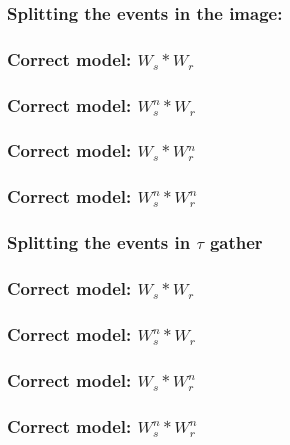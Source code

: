 \begin{frame}
\begin{center}
 \frametitle{ Splitting the events in the image:} 
\end{center}
\end{frame}

\begin{frame} \frametitle{Correct model: $W_{s}  *W_{r} $}
\end{frame}

\begin{frame} \frametitle{Correct model: $W_{s}^{n} *W_{r} $}
\end{frame}

\begin{frame} \frametitle{Correct model: $W_{s} * W_{r}^{n} $}
\end{frame}

\begin{frame} \frametitle{Correct model: $W_{s}^{n} *W_{r}^{n} $}
\end{frame}







\begin{frame} \frametitle{Splitting the events in $\tau$ gather} \end{frame}

\begin{frame} \frametitle{Correct model: $W_{s} * W_{r} $}
\end{frame}

\begin{frame} \frametitle{Correct model: $W_{s}^{n} * W_{r} $}
\end{frame}

\begin{frame} \frametitle{Correct model: $W_{s} * W_{r}^{n} $}
\end{frame}

\begin{frame} \frametitle{Correct model: $W_{s}^{n} * W_{r}^{n} $}
\end{frame}








